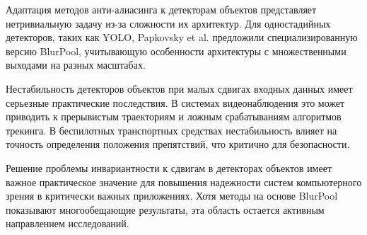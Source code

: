 Адаптация методов анти-алиасинга к детекторам объектов представляет нетривиальную задачу из-за сложности их архитектур. Для одностадийных детекторов, таких как YOLO, Papkovsky et al. \cite{papkovsky2023shift} предложили специализированную версию BlurPool, учитывающую особенности архитектуры с множественными выходами на разных масштабах.

Нестабильность детекторов объектов при малых сдвигах входных данных имеет серьезные практические последствия. В системах видеонаблюдения это может приводить к прерывистым траекториям и ложным срабатываниям алгоритмов трекинга. В беспилотных транспортных средствах нестабильность влияет на точность определения положения препятствий, что критично для безопасности.

Решение проблемы инвариантности к сдвигам в детекторах объектов имеет важное практическое значение для повышения надежности систем компьютерного зрения в критически важных приложениях. Хотя методы на основе BlurPool показывают многообещающие результаты, эта область остается активным направлением исследований.

\newpage
